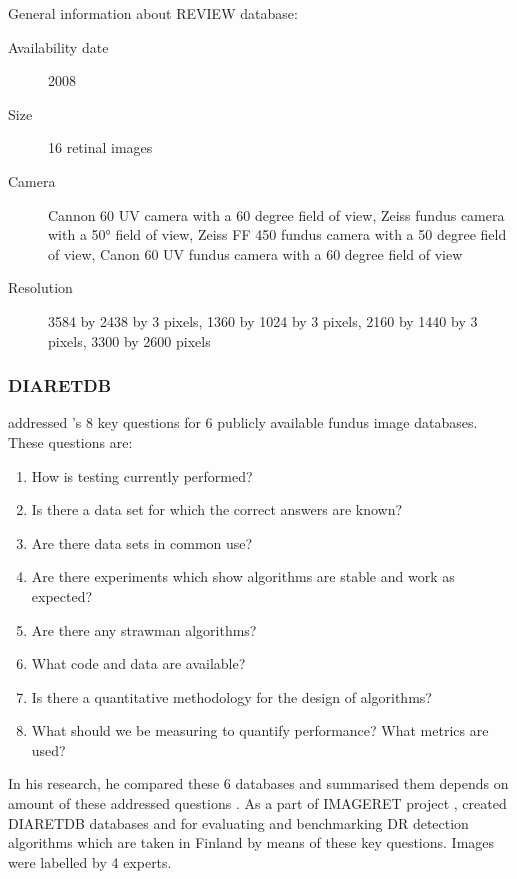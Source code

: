 General information about REVIEW database:
\begin{description}
    \item[Availability date] 2008
    \item[Size] 16 retinal images
    \item[Camera] Cannon 60 UV camera with a 60 degree field of view, Zeiss fundus camera with a 50° field of view, Zeiss  FF 450 fundus  camera with a 50 degree  field of view, Canon 60 UV fundus  camera with a 60 degree field of view
    \item[Resolution] 3584 by 2438 by 3 pixels, 1360 by 1024 by 3 pixels, 2160 by 1440 by 3 pixels, 3300 by 2600 pixels
\end{description}

\subsubsection{DIARETDB}

\citet{kauppi2013constructing} addressed \citet{thacker2008performance}'s 8 key questions for 6 publicly available fundus image databases. These questions are:

\begin{enumerate}
    \item How is testing currently performed?
    \item Is there a data set for which the correct answers are known?
    \item Are there data sets in common use?
    \item Are there experiments which show algorithms are stable and work as expected?
    \item Are there any strawman algorithms?
    \item What code and data are available?
    \item Is there a quantitative methodology for the design of algorithms?
    \item What should we be measuring to quantify performance? What metrics are used?
\end{enumerate}

In his research, he compared these 6 databases and summarised them depends on amount of these addressed questions \citep{kauppi2013constructing}. As a part of IMAGERET project \citep{IMAGERET}, \citet{kauppi2013constructing} created DIARETDB databases \citet{DIARETDB0} and \citet{DIARETDB1V2_1} for evaluating and benchmarking DR detection algorithms which are taken in Finland by means of these key questions. Images were labelled by 4 experts.

